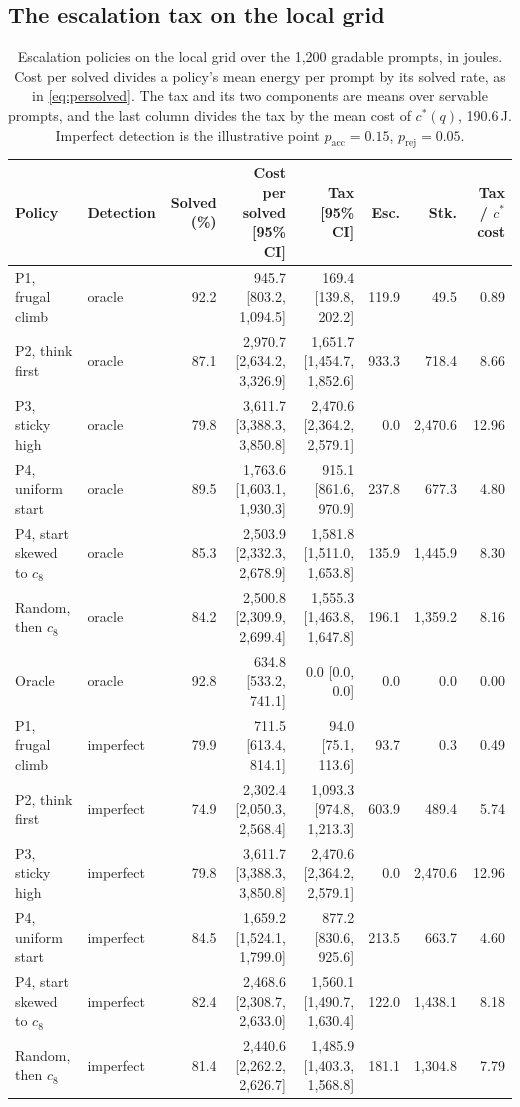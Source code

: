 \documentclass[final,5p,times,twocolumn]{elsarticle}
\theoremstyle{plain}
\newcommand{\cstar}{c^{*}}
\begin{document}
\subsection{The escalation tax on the local grid}
\label{sec:results-tax}

\begin{table}[ht]
\centering
\small
\caption{Escalation policies on the local grid over the 1{,}200 gradable
prompts, in joules. Cost per solved divides a policy's mean energy per prompt
by its solved rate, as in \eqref{eq:persolved}. The tax and its two
components are means over servable prompts, and the last column divides the
tax by the mean cost of $\cstar(q)$, 190.6\,J. Imperfect detection is the
illustrative point $p_{\mathrm{acc}} = 0.15$, $p_{\mathrm{rej}} = 0.05$.}
\label{tab:tax}
\begin{tabular}{@{}llrrrrrr@{}}
\toprule
Policy & Detection & Solved (\%) & Cost per solved [95\% CI] & Tax [95\% CI] & Esc. & Stk. & Tax / $c^*$ cost \\
\midrule
P1, frugal climb & oracle & 92.2 & 945.7 [803.2, 1{,}094.5] & 169.4 [139.8, 202.2] & 119.9 & 49.5 & 0.89 \\
P2, think first & oracle & 87.1 & 2{,}970.7 [2{,}634.2, 3{,}326.9] & 1{,}651.7 [1{,}454.7, 1{,}852.6] & 933.3 & 718.4 & 8.66 \\
P3, sticky high & oracle & 79.8 & 3{,}611.7 [3{,}388.3, 3{,}850.8] & 2{,}470.6 [2{,}364.2, 2{,}579.1] & 0.0 & 2{,}470.6 & 12.96 \\
P4, uniform start & oracle & 89.5 & 1{,}763.6 [1{,}603.1, 1{,}930.3] & 915.1 [861.6, 970.9] & 237.8 & 677.3 & 4.80 \\
P4, start skewed to $c_8$ & oracle & 85.3 & 2{,}503.9 [2{,}332.3, 2{,}678.9] & 1{,}581.8 [1{,}511.0, 1{,}653.8] & 135.9 & 1{,}445.9 & 8.30 \\
Random, then $c_8$ & oracle & 84.2 & 2{,}500.8 [2{,}309.9, 2{,}699.4] & 1{,}555.3 [1{,}463.8, 1{,}647.8] & 196.1 & 1{,}359.2 & 8.16 \\
Oracle & oracle & 92.8 & 634.8 [533.2, 741.1] & 0.0 [0.0, 0.0] & 0.0 & 0.0 & 0.00 \\
\midrule
P1, frugal climb & imperfect & 79.9 & 711.5 [613.4, 814.1] & 94.0 [75.1, 113.6] & 93.7 & 0.3 & 0.49 \\
P2, think first & imperfect & 74.9 & 2{,}302.4 [2{,}050.3, 2{,}568.4] & 1{,}093.3 [974.8, 1{,}213.3] & 603.9 & 489.4 & 5.74 \\
P3, sticky high & imperfect & 79.8 & 3{,}611.7 [3{,}388.3, 3{,}850.8] & 2{,}470.6 [2{,}364.2, 2{,}579.1] & 0.0 & 2{,}470.6 & 12.96 \\
P4, uniform start & imperfect & 84.5 & 1{,}659.2 [1{,}524.1, 1{,}799.0] & 877.2 [830.6, 925.6] & 213.5 & 663.7 & 4.60 \\
P4, start skewed to $c_8$ & imperfect & 82.4 & 2{,}468.6 [2{,}308.7, 2{,}633.0] & 1{,}560.1 [1{,}490.7, 1{,}630.4] & 122.0 & 1{,}438.1 & 8.18 \\
Random, then $c_8$ & imperfect & 81.4 & 2{,}440.6 [2{,}262.2, 2{,}626.7] & 1{,}485.9 [1{,}403.3, 1{,}568.8] & 181.1 & 1{,}304.8 & 7.79 \\
\bottomrule
\end{tabular}

\end{table}
\end{document}
